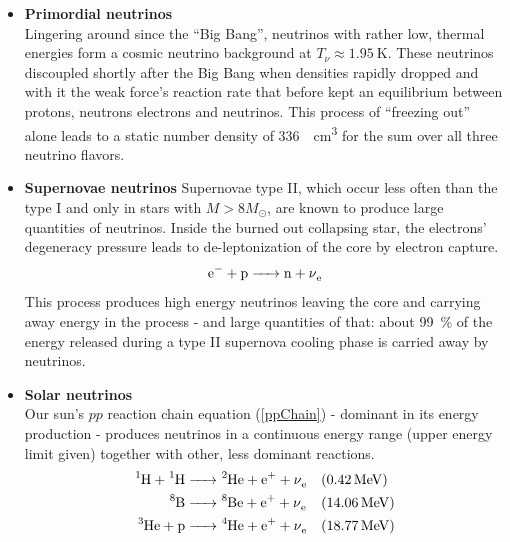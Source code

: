 	\begin{itemize}
	\item {\bf Primordial neutrinos}\\
		Lingering around since the ``Big Bang'', neutrinos with rather low, thermal energies form a cosmic neutrino background at $T_\nu\approx \SI{1.95}{\kelvin}$. These neutrinos discoupled shortly after the Big Bang when densities rapidly dropped and with it the weak force's reaction rate that before kept an equilibrium between protons, neutrons electrons and neutrinos. This process of ``freezing out'' alone leads to a static number density of \SI{336}{\per\cubic\centi\meter} for the sum over all three neutrino flavors.
	\item {\bf Supernovae neutrinos}
		Supernovae type II, which occur less often than the type I and only in stars with $M> 8M_\odot$, are known to produce large quantities of neutrinos. Inside the burned out collapsing star, the electrons' degeneracy pressure leads to de-leptonization of the core by electron capture.
		\begin{equation}
			\ce{e- + p -> n + \nu_e}
		\end{equation}
		This process produces high energy neutrinos leaving the core and carrying away energy in the process - and large quantities of that: about \SI{99}{\percent} of the energy released during a type II supernova cooling phase is carried away by neutrinos.

	\item {\bf Solar neutrinos}\\
		Our sun's $pp$ reaction chain equation (\ref{ppChain}) - dominant in its energy production - produces neutrinos in a continuous energy range (upper energy limit given) together with other, less dominant reactions.
		\begin{align}
		\label{ppChain}
			\ce{^1H + ^1 H} & \ce{ -> ^2 He + e+ + \nu_e} && (\SI{0.42}{\mega\electronvolt})\\
			\ce{^8B } & \ce{-> ^8Be + e+ + \nu_e} && (\SI{14.06}{\mega\electronvolt})\\
			\ce{^3He + p } & \ce{ -> ^4He + e+ + \nu_e} && (\SI{18.77}{\mega\electronvolt})
		\end{align}


\end{itemize}
